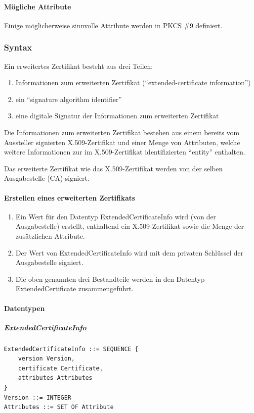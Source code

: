 \documentclass[10pt,a4paper]{article}
\begin{document}
\paragraph{Mögliche Attribute}
Einige möglicherweise sinnvolle Attribute werden in PKCS \#9 definiert.

\subsubsection{Syntax}
Ein erweitertes Zertifikat besteht aus drei Teilen:
\begin{enumerate}
    \item Informationen zum erweiterten Zertifikat ("`extended-certificate information"')
    \item ein "`signature algorithm identifier"'
    \item eine digitale Signatur der Informationen zum erweiterten Zertifikat
\end{enumerate}

Die Informationen zum erweiterten Zertifikat bestehen aus einem bereits vom Aussteller
signierten X.509-Zertifikat und einer Menge von Attributen, welche weitere Informationen
zur im X.509-Zertifikat identifizierten "`entity"' enthalten.

Das erweiterte Zertifikat wie das X.509-Zertifikat werden von der selben Ausgabestelle
(CA) signiert.

\paragraph{Erstellen eines erweiterten Zertifikats}
\begin{enumerate}
    \item Ein Wert für den Datentyp ExtendedCertificateInfo wird (von der Ausgabestelle)
        erstellt, enthaltend ein X.509-Zertifikat sowie die Menge der zusätzlichen
        Attribute.
    \item Der Wert von ExtendedCertificateInfo wird mit dem privaten Schlüssel der
        Ausgabestelle signiert.
    \item Die oben genannten drei Bestandteile werden in den Datentyp ExtendedCertificate
        zusammengeführt.
\end{enumerate}

\paragraph{Datentypen}
\subparagraph{ExtendedCertificateInfo}
\begin{verbatim}
ExtendedCertificateInfo ::= SEQUENCE {
    version Version,
    certificate Certificate,
    attributes Attributes
}
Version ::= INTEGER
Attributes ::= SET OF Attribute
\end{verbatim}
\end{document}
